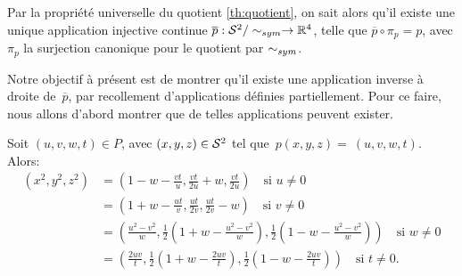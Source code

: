\documentclass[hidelinks, 10pt]{article}
\begin{document}
Par la propriété universelle du quotient \ref{th:quotient}, on sait alors qu'il existe une unique application injective continue $\overline{p}:\mathcal{S}^{2}/\sim_{sym}\to\mathbb{R}^4$, 
telle que $\overline{p}\circ\pi_p=p$, avec $\pi_p$ la surjection canonique pour le quotient par $\sim_{sym}$.

\bigskip Notre objectif à présent est de montrer qu'il existe une application  inverse à droite de~$\overline{p}$, par recollement d'applications définies partiellement. Pour ce faire, nous allons d'abord montrer que de telles applications peuvent exister.

\begin{lemma}\label{lemma:projective-square}
Soit $(u,v,w,t)\in P$, avec $(x,y,z)\in\mathcal{S}^{2}$ tel que~$p(x,y,z)=~(u,v,w,t)$. Alors:\[\begin{split}
    (x^2,y^2,z^2)&=\left(1-w-\frac{vt}{u}, \frac{vt}{2u}+w, \frac{vt}{2u}\right)\quad\text{si }u\neq0\\
    &=\left(1+w-\frac{ut}{v},\frac{ut}{2v},\frac{ut}{2v}-w\right)\quad\text{si }v\neq0\\
    &=\left(\frac{u^2-v^2}{w},\frac{1}{2}\left(1+w-\frac{u^2-v^2}{w}\right),\frac{1}{2}\left(1-w-\frac{u^2-v^2}{w}\right)\right)\quad\text{si }w\neq0\\
    &=\left(\frac{2uv}{t},\frac{1}{2}\left(1+w-\frac{2uv}{t}\right),\frac{1}{2}\left(1-w-\frac{2uv}{t}\right)\right)\quad\text{si }t\neq0.
\end{split}\]
\end{lemma}
\end{document}
